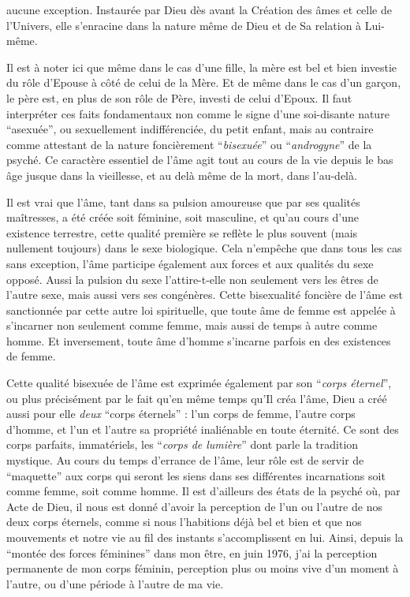 
aucune exception. Instaurée par Dieu dès avant la Création des âmes et celle de l'Univers, elle s'enracine dans la nature même de Dieu et de Sa relation à Lui-même.

Il est à noter ici que même dans le cas d'une fille, la mère est bel et bien investie du rôle d'Epouse à côté de celui de la Mère. Et de même dans le cas d'un garçon, le père est, en plus de son rôle de Père, investi de celui d'Epoux. Il faut interpréter ces faits fondamentaux non comme le signe d'une soi-disante nature ``asexuée'', ou sexuellement indifférenciée, du petit enfant, mais au contraire comme attestant de la nature foncièrement ``\textit{bisexuée}'' ou ``\textit{androgyne}'' de la psyché. Ce caractère essentiel de l'âme agit tout au cours de la vie depuis le bas âge jusque dans la vieillesse, et au delà même de la mort, dans l'au-delà.

Il est vrai que l'âme, tant dans sa pulsion amoureuse que par ses qualités maîtresses, a été créée soit féminine, soit masculine, et qu'au cours d'une existence terrestre, cette qualité première se reflète le plus souvent (mais nullement toujours) dans le sexe biologique. Cela n'empêche que dans tous les cas sans exception, l'âme participe également aux forces et aux qualités du sexe opposé. Aussi la pulsion du sexe l'attire-t-elle non seulement vers les êtres de l'autre sexe, mais aussi vers ses congénères. Cette bisexualité foncière de l'âme est sanctionnée par cette autre loi spirituelle, que toute âme de femme est appelée à s'incarner non seulement comme femme, mais aussi de temps à autre comme homme. Et inversement, toute âme d'homme s'incarne parfois en des existences de femme.

Cette qualité bisexuée de l'âme est exprimée également par son ``\textit{corps éternel}'', ou plus précisément par le fait qu'en même temps qu'Il créa l'âme, Dieu a créé aussi pour elle \textit{deux} ``corps éternels'' : l'un corps de femme, l'autre corps d'homme, et l'un et l'autre sa propriété inaliénable en toute éternité. Ce sont des corps parfaits, immatériels, les ``\textit{corps de lumière}'' dont parle la tradition mystique. Au cours du temps d'errance de l'âme, leur rôle est de servir de ``maquette'' aux corps qui seront les siens dans ses différentes incarnations soit comme femme, soit comme homme. Il est d'ailleurs des états de la psyché où, par Acte de Dieu, il nous est donné d'avoir la perception de l'un ou l'autre de nos deux corps éternels, comme si nous l'habitions déjà bel et bien et que nos mouvements et notre vie au fil des instants s'accomplissent en lui. Ainsi, depuis la ``montée des forces féminines'' dans mon être, en juin 1976, j'ai la perception permanente de mon corps féminin, perception plus ou moins vive d'un moment à l'autre, ou d'une période à l'autre de ma vie.

